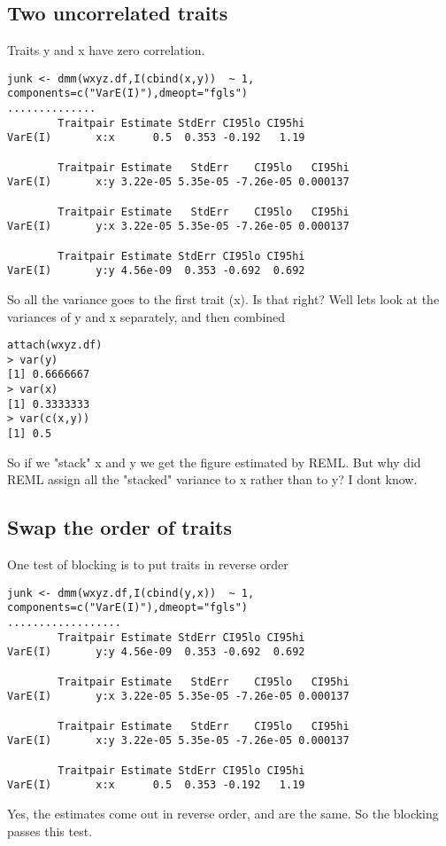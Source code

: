 \documentclass{report}  %
\begin{document}
\subsection{Two uncorrelated traits}
Traits y and x have zero correlation. 
\begin{verbatim}
junk <- dmm(wxyz.df,I(cbind(x,y))  ~ 1, components=c("VarE(I)"),dmeopt="fgls")
..............
        Traitpair Estimate StdErr CI95lo CI95hi
VarE(I)       x:x      0.5  0.353 -0.192   1.19

        Traitpair Estimate   StdErr    CI95lo   CI95hi
VarE(I)       x:y 3.22e-05 5.35e-05 -7.26e-05 0.000137

        Traitpair Estimate   StdErr    CI95lo   CI95hi
VarE(I)       y:x 3.22e-05 5.35e-05 -7.26e-05 0.000137

        Traitpair Estimate StdErr CI95lo CI95hi
VarE(I)       y:y 4.56e-09  0.353 -0.692  0.692
\end{verbatim}
  So all the variance goes to the first trait (x). Is that right? Well lets look at the variances of y and x separately, and then combined
\begin{verbatim}
attach(wxyz.df)
> var(y)
[1] 0.6666667
> var(x)
[1] 0.3333333
> var(c(x,y))
[1] 0.5
\end{verbatim}

So if we "stack" x and y we get the figure estimated by REML.
But why did REML assign all the "stacked" variance to x rather than to y?
I dont know.

\subsection{Swap the order of traits}
One test of blocking is to put traits in reverse order
\begin{verbatim}
junk <- dmm(wxyz.df,I(cbind(y,x))  ~ 1, components=c("VarE(I)"),dmeopt="fgls")
..................
        Traitpair Estimate StdErr CI95lo CI95hi
VarE(I)       y:y 4.56e-09  0.353 -0.692  0.692

        Traitpair Estimate   StdErr    CI95lo   CI95hi
VarE(I)       y:x 3.22e-05 5.35e-05 -7.26e-05 0.000137

        Traitpair Estimate   StdErr    CI95lo   CI95hi
VarE(I)       x:y 3.22e-05 5.35e-05 -7.26e-05 0.000137

        Traitpair Estimate StdErr CI95lo CI95hi
VarE(I)       x:x      0.5  0.353 -0.192   1.19
\end{verbatim}
 Yes, the estimates come out in reverse order, and are the same.
So the blocking passes this test.
\end{document}
